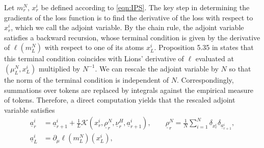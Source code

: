 \documentclass{article}
\begin{document}
Let $m^N_r$, $x^i_r$ be defined according to \eqref{eqn:IPS}. The key step in determining the gradients of the loss function is to find the derivative of the loss with respect to $x^i_r$, which we call the adjoint variable. By the chain rule, the adjoint variable satisfies a backward recursion, whose terminal condition is given by the derivative of $\ell(m^N_L)$ with respect to one of its atoms $x^i_L$. Proposition 5.35 in \cite{carmona2018probabilistic} states that this terminal condition coincides with Lions' derivative of $\ell$ evaluated at $(\mu^N_L,x^i_L)$ multiplied by $N^{-1}$. We can rescale the adjoint variable by $N$ so that the norm of the terminal condition is independent of $N$. Correspondingly, summations over tokens are replaced by integrals against the empirical measure of tokens. Therefore, a direct computation yields that the rescaled adjoint variable satisfies
\begin{align}\label{adjoint}
  \underline{a}^{i}_{r} &= \underline{a}^{i}_{r+1} +\frac{1}{L}\mathcal K(x^i_r,\underline{\rho}^N_r,\underline{\nu}^H_r,\underline{a}^i_{r+1}),\qquad \underline{\rho}^N_{r}= \frac{1}{N}\sum_{i=1}^N \delta_{x^i_{r}}\delta_{\underline{a}^{i}_{r+1}},\\
   \underline{a}^i_{L} &= \partial_\mu \ell(m^N_L)(x^i_L),\label{eqn:adjoint_TC}
\end{align}
\end{document}
